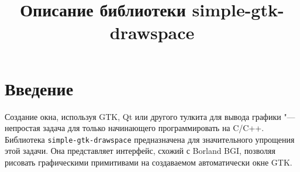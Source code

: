\documentclass[a4paper,11pt]{article}
\title{Описание библиотеки \textbf{simple-gtk-drawspace}}
\begin{document}
\maketitle
\section{Введение}
Создание окна, используя GTK, Qt или другого тулкита для вывода графики "--- непростая задача для только начинающего программировать на C/C++. Библиотека \verb!simple-gtk-drawspace! предназначена для значительного упрощения этой задачи. Она представляет интерфейс, схожий с Borland BGI, позволяя рисовать графическими примитивами на создаваемом автоматически окне GTK. 
\section{}
\end{document}

